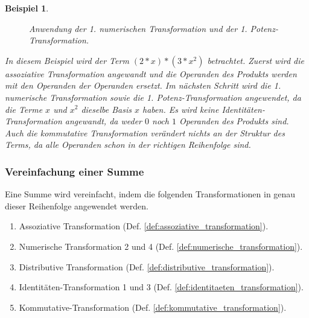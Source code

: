 \documentclass[11pt]{article}
\newcommand{\lab}[1]{(Def. \ref{#1})}
\newtheorem{example}{Beispiel}
\begin{document}
\begin{example}
\begin{figure}[h]
    \caption{Anwendung der 1. numerischen Transformation und der 1. Potenz-Transformation.}
  \end{figure}
  In diesem Beispiel wird der Term $(2*x)*(3*x^2)$ betrachtet. Zuerst wird die assoziative Transformation angewandt und
  die Operanden des Produkts werden mit den Operanden der Operanden ersetzt. Im nächsten Schritt wird die 1. numerische 
  Transformation sowie die 1. Potenz-Transformation angewendet, da die Terme $x$ und $x^2$ dieselbe Basis $x$ haben.
  Es wird keine Identitäten-Transformation angewandt, da weder $0$ noch $1$ Operanden des Produkts sind.
  Auch die kommutative Transformation verändert nichts an der Struktur des Terms, da alle Operanden schon in der richtigen
  Reihenfolge sind.
\end{example}

\subsubsection{Vereinfachung einer Summe}
Eine Summe wird vereinfacht, indem die folgenden 
Transformationen in genau dieser Reihenfolge angewendet werden.
\begin{enumerate}
  \item Assoziative Transformation \lab{def:assoziative_transformation}.
  \item Numerische Transformation 2 und 4 \lab{def:numerische_transformation}.
  \item Distributive Transformation \lab{def:distributive_transformation}.
  \item Identitäten-Transformation 1 und 3 \lab{def:identitaeten_transformation}.
  \item Kommutative-Transformation \lab{def:kommutative_transformation}.
\end{enumerate}
\end{document}
